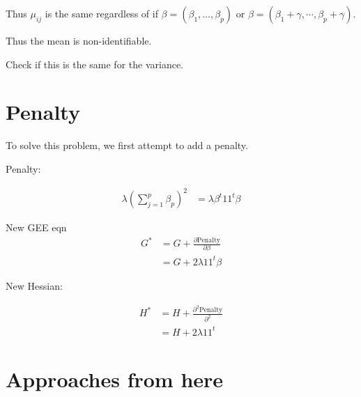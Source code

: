 \documentclass[10pt]{article}
\theoremstyle{definition}
\begin{document}
Thus $\mu_{ij}$ is the same regardless of if $\beta = (\beta_1, \ldots, \beta_p)$ or $\beta = (\beta_1 + \gamma, \cdots , \beta_p + \gamma)$.

Thus the mean is non-identifiable.

Check if this is the same for the variance.

\newpage
\section{Penalty}

To solve this problem, we first attempt to add a penalty.

Penalty:

\begin{align*}
  \lambda \left(\sum_{j=1}^p \beta_p \right)^2 &= \lambda \beta^t 1 1^t \beta
\end{align*}

New GEE eqn
\begin{align*}
 G^* &= G + \frac{\partial \text{Penalty}}{\partial \beta} \\
 &= G + 2\lambda 1 1^t \beta
\end{align*}

 New Hessian:

 \begin{align*}
   H^* &= H + \frac{\partial ^2 \text{Penalty}}{\partial ^2 } \\
   &= H + 2 \lambda 1 1^t
 \end{align*}

\section{Approaches from here}


\newpage
\printbibliography
\end{document}
